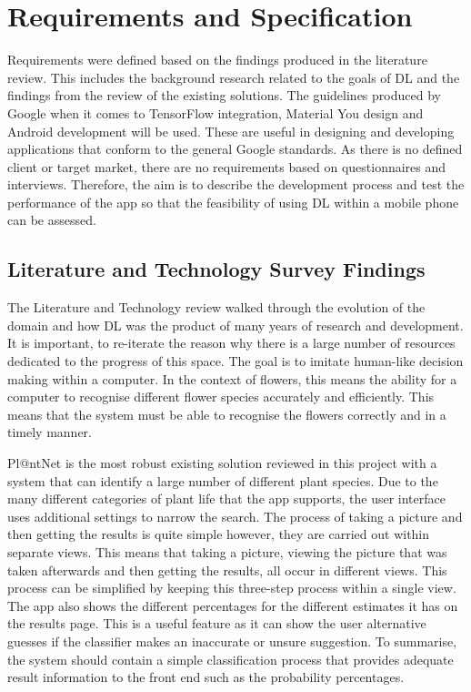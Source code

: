 \documentclass[12pt,a4paper]{report}
\begin{document}
\section{Requirements and Specification}

\label{subsec:req}

Requirements were defined based on the findings produced in the literature review. This includes the background research 
related to the goals of DL and the findings from the review of the existing solutions. The 
guidelines produced by Google when it comes to TensorFlow integration, Material You design and Android development will be used. 
These are useful in designing and developing applications that conform to the general Google standards. As there is
no defined client or target market, there are no requirements based on questionnaires and interviews. 
Therefore, the aim is to describe the development process and test the performance of the app so that the feasibility of 
using DL within a mobile phone can be assessed. 

\subsection{Literature and Technology Survey Findings}

The Literature and Technology review walked through the evolution of the domain and how DL was the product of many years
of research and development. It is important, to re-iterate the reason why there is a large number of resources 
dedicated to the progress of this space. The goal is to imitate human-like decision making within a computer. In the 
context of flowers, this means the ability for a computer to recognise different flower species accurately and 
efficiently. This means that the system must be able to recognise the flowers correctly and in a timely manner.

\par

Pl@ntNet is the most robust existing solution reviewed in this project with a system that can identify a large number of 
different plant species. Due to the many different categories of plant life that the app supports, the user interface 
uses additional settings to narrow the search. The process of taking a picture and then getting the results is quite 
simple however, they are carried out within separate views.  This means that taking a picture, viewing the picture that 
was taken afterwards and then getting the results, all occur in different views. This process can be simplified
by keeping this three-step process within a single view. The app also shows the different percentages for the 
different estimates it has on the results page. This is a useful feature as it can show the user alternative 
guesses if the classifier makes an inaccurate or unsure suggestion. To summarise, the system should contain a
simple classification process that provides adequate result information to the front end such as the probability 
percentages. 
\end{document}

